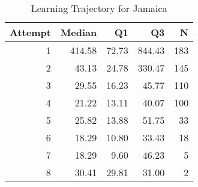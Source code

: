 \begin{table}[htbp]
\centering
\caption{Learning Trajectory for Jamaica}
\label{tab:learning-trajectory}
\begin{tabular}{rrrrr}
\toprule
Attempt & Median & Q1 & Q3 & N \\
\midrule
1 & 414.58 & 72.73 & 844.43 & 183 \\
2 & 43.13 & 24.78 & 330.47 & 145 \\
3 & 29.55 & 16.23 & 45.77 & 110 \\
4 & 21.22 & 13.11 & 40.07 & 100 \\
5 & 25.82 & 13.88 & 51.75 & 33 \\
6 & 18.29 & 10.80 & 33.43 & 18 \\
7 & 18.29 & 9.60 & 46.23 & 5 \\
8 & 30.41 & 29.81 & 31.00 & 2 \\
\bottomrule
\end{tabular}
\end{table}